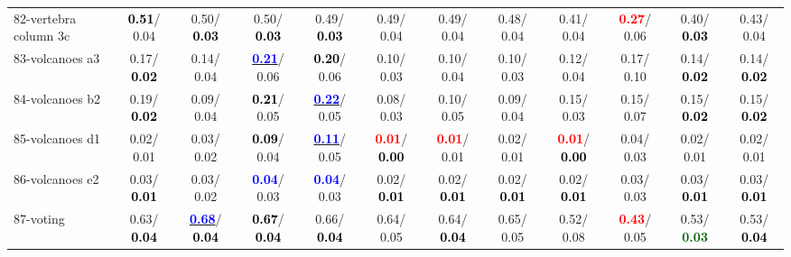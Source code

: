 \begin{table}[h]
\begin{center}
{\begin{tabular}{lc|c|c|c|c|c|c|c|c|c|c}
82-vertebra column 3c & \textcolor{black}{\textbf{  0.51}}/  0.04 &   0.50/\textcolor{black}{\textbf{  0.03}} &   0.50/\textcolor{black}{\textbf{  0.03}} &   0.49/\textcolor{black}{\textbf{  0.03}} &   0.49/  0.04 &   0.49/  0.04 &   0.48/  0.04 &   0.41/  0.04 & \textcolor{red}{\textbf{  0.27}}/  0.06 &   0.40/\textcolor{black}{\textbf{  0.03}} &   0.43/  0.04 \\
83-volcanoes a3 &   0.17/\textcolor{black}{\textbf{  0.02}} &   0.14/  0.04 & \underline{\textcolor{blue}{\textbf{  0.21}}}/  0.06 & \textcolor{black}{\textbf{  0.20}}/  0.06 &   0.10/  0.03 &   0.10/  0.04 &   0.10/  0.03 &   0.12/  0.04 &   0.17/  0.10 &   0.14/\textcolor{black}{\textbf{  0.02}} &   0.14/\textcolor{black}{\textbf{  0.02}} \\
84-volcanoes b2 &   0.19/\textcolor{black}{\textbf{  0.02}} &   0.09/  0.04 & \textcolor{black}{\textbf{  0.21}}/  0.05 & \underline{\textcolor{blue}{\textbf{  0.22}}}/  0.05 &   0.08/  0.03 &   0.10/  0.05 &   0.09/  0.04 &   0.15/  0.03 &   0.15/  0.07 &   0.15/\textcolor{black}{\textbf{  0.02}} &   0.15/\textcolor{black}{\textbf{  0.02}} \\
85-volcanoes d1 &   0.02/  0.01 &   0.03/  0.02 & \textcolor{black}{\textbf{  0.09}}/  0.04 & \underline{\textcolor{blue}{\textbf{  0.11}}}/  0.05 & \textcolor{red}{\textbf{  0.01}}/\textcolor{black}{\textbf{  0.00}} & \textcolor{red}{\textbf{  0.01}}/  0.01 &   0.02/  0.01 & \textcolor{red}{\textbf{  0.01}}/\textcolor{black}{\textbf{  0.00}} &   0.04/  0.03 &   0.02/  0.01 &   0.02/  0.01 \\ \hline
86-volcanoes e2 &   0.03/\textcolor{black}{\textbf{  0.01}} &   0.03/  0.02 & \textcolor{blue}{\textbf{  0.04}}/  0.03 & \textcolor{blue}{\textbf{  0.04}}/  0.03 &   0.02/\textcolor{black}{\textbf{  0.01}} &   0.02/\textcolor{black}{\textbf{  0.01}} &   0.02/\textcolor{black}{\textbf{  0.01}} &   0.02/\textcolor{black}{\textbf{  0.01}} &   0.03/  0.03 &   0.03/\textcolor{black}{\textbf{  0.01}} &   0.03/\textcolor{black}{\textbf{  0.01}} \\
87-voting &   0.63/\textcolor{black}{\textbf{  0.04}} & \underline{\textcolor{blue}{\textbf{  0.68}}}/\textcolor{black}{\textbf{  0.04}} & \textcolor{black}{\textbf{  0.67}}/\textcolor{black}{\textbf{  0.04}} &   0.66/\textcolor{black}{\textbf{  0.04}} &   0.64/  0.05 &   0.64/\textcolor{black}{\textbf{  0.04}} &   0.65/  0.05 &   0.52/  0.08 & \textcolor{red}{\textbf{  0.43}}/  0.05 &   0.53/\textcolor{darkgreen}{\textbf{  0.03}} &   0.53/\textcolor{black}{\textbf{  0.04}} \\

\end{tabular}}
\end{center}
\end{table}
